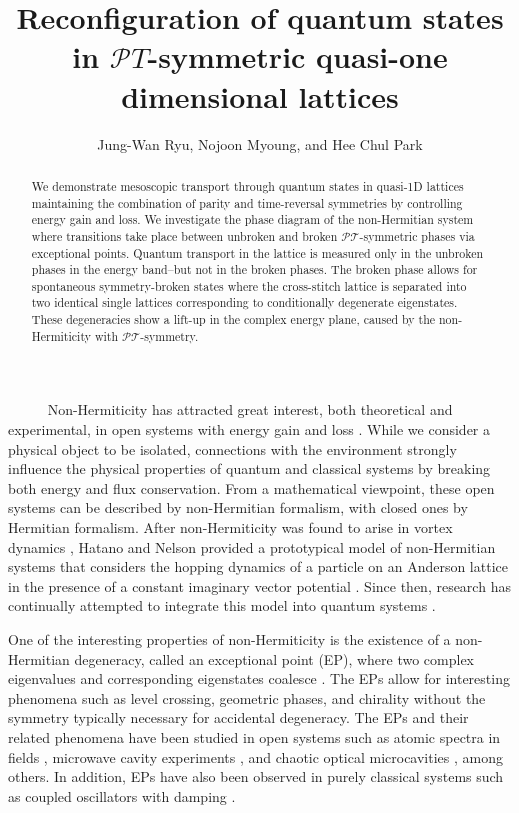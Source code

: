 \documentclass[report,epsfig,pre]{revtex4}
\begin{document}
\draft
\title{Reconfiguration of quantum states in $\mathcal PT$-symmetric quasi-one dimensional lattices}
\author{Jung-Wan Ryu, Nojoon Myoung, and Hee Chul Park}

\begin{abstract}
We demonstrate mesoscopic transport through quantum states in quasi-1D lattices maintaining the combination of parity and time-reversal symmetries by controlling energy gain and loss. We investigate the phase diagram of the non-Hermitian system where transitions take place between unbroken and broken $\mathcal{PT}$-symmetric phases via exceptional points. Quantum transport in the lattice is measured only in the unbroken phases in the energy band--but not in the broken phases. The broken phase allows for spontaneous symmetry-broken states where the cross-stitch lattice is separated into two identical single lattices corresponding to conditionally degenerate eigenstates. These degeneracies show a lift-up in the complex energy plane, caused by the non-Hermiticity with $\mathcal{PT}$-symmetry.
\end{abstract}

\maketitle



~~~~~ Non-Hermiticity has attracted great interest, both theoretical and experimental, in open systems with energy gain and loss \cite{Moi11}. While we consider a physical object to be isolated, connections with the environment strongly influence the physical properties of quantum and classical systems by breaking both energy and flux conservation. From a mathematical viewpoint, these open systems can be described by non-Hermitian formalism, with closed ones by Hermitian formalism.
After non-Hermiticity was found to arise in vortex dynamics \cite{Nel93}, Hatano and Nelson provided a prototypical model of non-Hermitian systems that considers the hopping dynamics of a particle on an Anderson lattice in the presence of a constant imaginary vector potential \cite{Hat96}. Since then, research has continually attempted to integrate this model into quantum systems \cite{Bro97, Sil98, Hat98}.

One of the interesting properties of non-Hermiticity is the existence of a non-Hermitian degeneracy, called an exceptional point (EP), where two complex eigenvalues and corresponding eigenstates coalesce \cite{Kat96, Hei12}. The EPs allow for interesting phenomena such as level crossing, geometric phases, and chirality without the symmetry typically necessary for accidental degeneracy. The EPs and their related phenomena have been studied in open systems such as atomic spectra in fields \cite{Lat95, Car07}, microwave cavity experiments \cite{Dem01, Dem03}, and chaotic optical microcavities \cite{Lee08, Lee09}, among others. In addition, EPs have also been observed in purely classical systems such as coupled oscillators with damping \cite{Hei04, Ste04, Ryu15}. 
\end{document}
